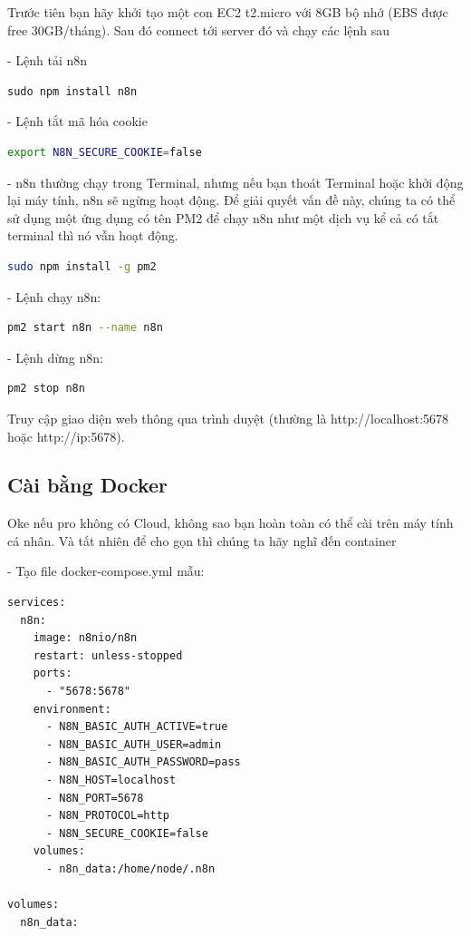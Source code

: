 Trước tiên bạn hãy khởi tạo một con EC2 t2.micro với 8GB bộ nhớ (EBS được free 30GB/tháng). Sau đó connect tới server đó và chạy các lệnh sau

- Lệnh tải n8n

\begin{lstlisting}
sudo npm install n8n
\end{lstlisting}

- Lệnh tắt mã hóa cookie

\begin{lstlisting}[language=bash]
export N8N_SECURE_COOKIE=false
\end{lstlisting}

- n8n thường chạy trong Terminal, nhưng nếu bạn thoát Terminal hoặc khởi động lại máy tính, n8n sẽ ngừng hoạt động. Để giải quyết vấn đề này, chúng ta có thể sử dụng một ứng dụng có tên PM2 để chạy n8n như một dịch vụ kể cả có tắt terminal thì nó vẫn hoạt động. 

\begin{lstlisting}[language=bash]
sudo npm install -g pm2
\end{lstlisting}

- Lệnh chạy n8n:
\begin{lstlisting}[language=bash]
pm2 start n8n --name n8n
\end{lstlisting}

- Lệnh dừng n8n:
\begin{lstlisting}[language=bash]
pm2 stop n8n
\end{lstlisting}

Truy cập giao diện web thông qua trình duyệt (thường là http://localhost:5678 hoặc http://ip:5678).



\subsection{Cài bằng Docker}
Oke nếu pro không có Cloud, không sao bạn hoàn toàn có thể cài trên máy tính cá nhân. Và tất nhiên để cho gọn thì chúng ta hãy nghĩ đến container

- Tạo file docker-compose.yml mẫu:
\begin{lstlisting}
services:
  n8n:
    image: n8nio/n8n
    restart: unless-stopped
    ports:
      - "5678:5678"
    environment:
      - N8N_BASIC_AUTH_ACTIVE=true
      - N8N_BASIC_AUTH_USER=admin
      - N8N_BASIC_AUTH_PASSWORD=pass
      - N8N_HOST=localhost
      - N8N_PORT=5678
      - N8N_PROTOCOL=http
      - N8N_SECURE_COOKIE=false
    volumes:
      - n8n_data:/home/node/.n8n

volumes:
  n8n_data:
\end{lstlisting}

